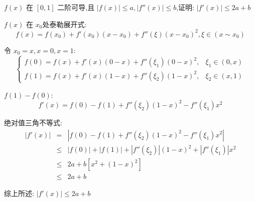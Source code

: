 \begin{proposition}
	$f(x)$ 在 $[0,1]$ 二阶可导,且 $|f(x)|\leq a,|f''(x)|\leq b$,证明: $|f'(x)|\leq 2a + b$
\end{proposition}
\begin{solution}

	$f(x)$ 在 $x_{0}$处泰勒展开式:
	$$f(x) = f(x_{0}) + f'(x_{0})(x-x_{0})+f''(\xi)(x-x_{0})^{2},\xi\in (x\sim x_{0})$$

	令 $x_{0} = x, x = 0, x = 1$:
	$$\begin{cases}
		f(0) = f(x) + f'(x)(0-x) + f''(\xi_{1})(0-x)^2, & \xi_{1}\in (0,x) \\
		f(1) = f(x) + f'(x)(1-x) + f''(\xi_{2})(1-x)^2, & \xi_{2}\in (x,1)
	\end{cases}$$

	$f(1) - f(0)$:
	$$f'(x) = f(0) - f(1) + f''(\xi_{2})(1-x)^2-f''(\xi_{1})x^2$$

	绝对值三角不等式:
	\begin{eqnarray*}
		|f'(x)| & =    & |f(0) - f(1) + f''(\xi_{2})(1-x)^2-f''(\xi_{1})x^2|\\
				& \leq & |f(0)| + |f(1)| + |f''(\xi_{2})|(1-x)^{2} + |f''(\xi_{1})|x^{2}\\
				& \leq & 2a + b\left[x^{2}+(1-x)^{2}\right]\\
				& \leq & 2a + b 
	\end{eqnarray*}

	综上所述: $|f'(x)|\leq 2a + b$
\end{solution}

